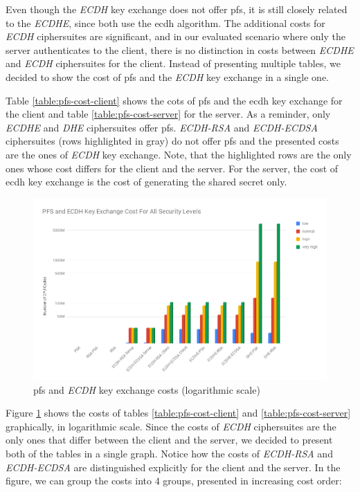 Even though the \textit{ECDH} key exchange does not offer \gls{pfs}, it is still closely related to the \textit{ECDHE}, since both use
the \gls{ecdh} algorithm. The additional costs for \textit{ECDH} ciphersuites are significant, and in our evaluated scenario where only the server
authenticates to the client, there is no distinction in costs between \textit{ECDHE} and \textit{ECDH} ciphersuites for the client. Instead of
presenting multiple tables, we decided to show the cost of \gls{pfs} and the \textit{ECDH} key exchange in a single one.

Table \ref{table:pfs-cost-client} shows the cots of \gls{pfs} and the \gls{ecdh} key exchange for the client and table \ref{table:pfs-cost-server}
for the server. As a reminder, only \textit{ECDHE} and \textit{DHE} ciphersuites offer \gls{pfs}. \textit{ECDH-RSA} and \textit{ECDH-ECDSA}
ciphersuites (rows highlighted in gray) do not offer \gls{pfs} and the presented costs are the ones of \textit{ECDH} key exchange. Note, that the
highlighted rows are the only ones whose cost differs for
the client and the server. For the server, the cost of \gls{ecdh} key exchange is the cost of generating the shared secret only.

\begin{figure}
  \centering
  \includegraphics[width=1.0\textwidth]{img/pfs_cost_all_sls.png}
  \centering \caption{\label{fig:pfs-cost-all-sls} \gls{pfs} and \textit{ECDH} key exchange costs (logarithmic scale)}
\end{figure}

Figure \ref{fig:pfs-cost-all-sls} shows the costs of tables \ref{table:pfs-cost-client} and \ref{table:pfs-cost-server} graphically, in logarithmic scale.
 Since the costs
of \textit{ECDH} ciphersuites are the only ones that differ between the client and the server, we decided to present both of the tables in a
single graph. Notice how the costs of \textit{ECDH-RSA} and \textit{ECDH-ECDSA} are distinguished explicitly for the client and the server.
In the figure, we can group the costs into $4$ groups, presented in increasing cost order:

